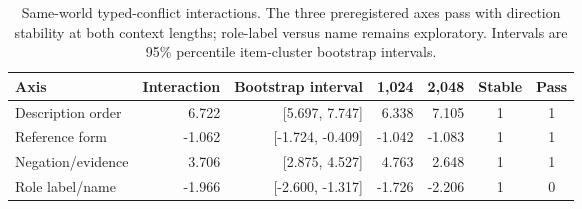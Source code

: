 \begin{table}[H]
\centering
\footnotesize
\setlength{\tabcolsep}{4pt}
\begin{tabularx}{\textwidth}{Xrrrrcc}
\toprule
Axis & Interaction & Bootstrap interval & 1,024 & 2,048 & Stable & Pass \\
\midrule
Description order & 6.722 & [5.697, 7.747] & 6.338 & 7.105 & 1 & 1 \\
Reference form & -1.062 & [-1.724, -0.409] & -1.042 & -1.083 & 1 & 1 \\
Negation/evidence & 3.706 & [2.875, 4.527] & 4.763 & 2.648 & 1 & 1 \\
Role label/name & -1.966 & [-2.600, -1.317] & -1.726 & -2.206 & 1 & 0 \\
\bottomrule
\end{tabularx}
\caption{Same-world typed-conflict interactions. The three preregistered axes pass with direction stability at both context lengths; role-label versus name remains exploratory. Intervals are 95\% percentile item-cluster bootstrap intervals.}
\label{tab:same-item}
\end{table}

